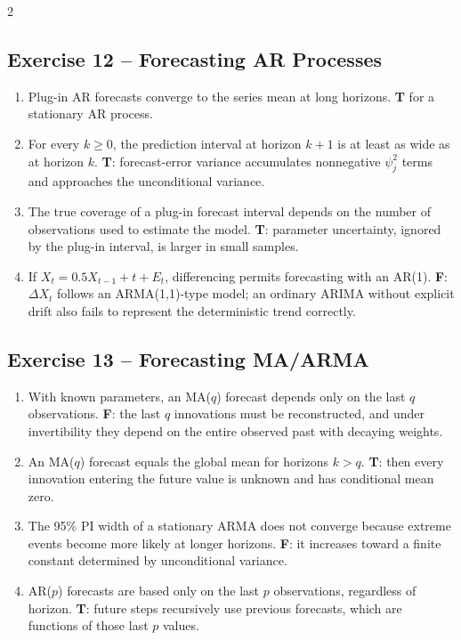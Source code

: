 \documentclass[9pt,a4paper]{extarticle}
\begin{document}
\begin{multicols}{2}
\subsection*{Exercise 12 -- Forecasting AR Processes}
\begin{enumerate}[label=\alph*),leftmargin=4mm]
\item Plug-in AR forecasts converge to the series mean at long horizons. \textbf{T} for a stationary AR process.
\item For every \(k\ge0\), the prediction interval at horizon \(k+1\) is at least as wide as at horizon \(k\). \textbf{T}: forecast-error variance accumulates nonnegative \(\psi_j^2\) terms and approaches the unconditional variance.
\item The true coverage of a plug-in forecast interval depends on the number of observations used to estimate the model. \textbf{T}: parameter uncertainty, ignored by the plug-in interval, is larger in small samples.
\item If \(X_t=0.5X_{t-1}+t+E_t\), differencing permits forecasting with an AR(1). \textbf{F}: \(\Delta X_t\) follows an ARMA(1,1)-type model; an ordinary ARIMA without explicit drift also fails to represent the deterministic trend correctly.
\end{enumerate}

\subsection*{Exercise 13 -- Forecasting MA/ARMA}
\begin{enumerate}[label=\alph*),leftmargin=4mm]
\item With known parameters, an MA(\(q\)) forecast depends only on the last \(q\) observations. \textbf{F}: the last \(q\) innovations must be reconstructed, and under invertibility they depend on the entire observed past with decaying weights.
\item An MA(\(q\)) forecast equals the global mean for horizons \(k>q\). \textbf{T}: then every innovation entering the future value is unknown and has conditional mean zero.
\item The 95\% PI width of a stationary ARMA does not converge because extreme events become more likely at longer horizons. \textbf{F}: it increases toward a finite constant determined by unconditional variance.
\item AR(\(p\)) forecasts are based only on the last \(p\) observations, regardless of horizon. \textbf{T}: future steps recursively use previous forecasts, which are functions of those last \(p\) values.
\end{enumerate}


\end{multicols}
\end{document}
